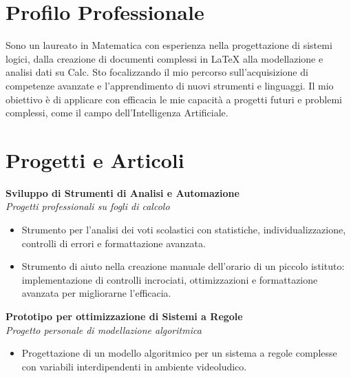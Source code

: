 \documentclass[10pt, a4paper]{article}
\begin{document}
	\hspace{0.03\textwidth}								%
	\begin{minipage}[t]{0.62\textwidth}					%
		
		\phantom{\small ciao!}	\vspace{-6pt}			%
		\section*{Profilo Professionale}
		
			Sono un laureato in Matematica con esperienza nella progettazione di sistemi logici, dalla creazione di documenti complessi in LaTeX alla modellazione e analisi dati su Calc. Sto focalizzando il mio percorso sull'acquisizione di competenze avanzate e l'apprendimento di nuovi strumenti e linguaggi. Il mio obiettivo è di applicare con efficacia le mie capacità a progetti futuri e problemi complessi, come il campo dell'Intelligenza Artificiale.
		
		
		\section*{Progetti e Articoli}
		
		\textbf{Sviluppo di Strumenti di Analisi e Automazione} \\
				\textit{Progetti professionali su fogli di calcolo}
		\begin{itemize}
			\item Strumento per l'analisi dei voti scolastici con statistiche, individualizzazione, controlli di errori e formattazione avanzata.
			\item Strumento di aiuto nella creazione manuale dell'orario di un piccolo istituto: implementazione di controlli incrociati, ottimizzazioni e formattazione avanzata per migliorarne l'efficacia.
		\end{itemize}
		\vspace{2mm}
		
		\textbf{Prototipo per ottimizzazione di Sistemi a Regole} \\
		\textit{Progetto personale di modellazione algoritmica}
		\begin{itemize}
			\item Progettazione di un modello algoritmico per un sistema a regole complesse con variabili interdipendenti in ambiente videoludico.
		\end{itemize}
		\vspace{2mm}
			

\end{minipage}
\end{document}
